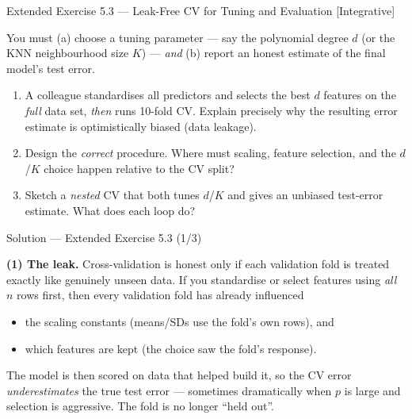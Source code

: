 \documentclass[aspectratio=169,11pt]{beamer}
\begin{document}
\begin{frame}{Extended Exercise 5.3 --- Leak-Free CV for Tuning and Evaluation [Integrative]}
  \begin{longexercise}
    You must (a) choose a tuning parameter --- say the polynomial degree
    $d$ (or the KNN neighbourhood size $K$) --- \emph{and} (b) report an
    honest estimate of the final model's test error.
    \begin{enumerate}
      \item A colleague standardises all predictors and selects the best
            $d$ features on the \emph{full} data set, \emph{then} runs
            10-fold CV. Explain precisely why the resulting error
            estimate is optimistically biased (data leakage).
      \item Design the \emph{correct} procedure. Where must scaling,
            feature selection, and the $d$/$K$ choice happen relative to
            the CV split?
      \item Sketch a \emph{nested} CV that both tunes $d$/$K$ and gives an
            unbiased test-error estimate. What does each loop do?
    \end{enumerate}
  \end{longexercise}
\end{frame}

\begin{frame}{Solution --- Extended Exercise 5.3 (1/3)}
  \begin{solutionbox}
    \textbf{(1) The leak.} Cross-validation is honest only if each
    validation fold is treated exactly like genuinely unseen data. If you
    standardise or select features using \emph{all} $n$ rows first, then
    every validation fold has already influenced
    \begin{itemize}
      \item the scaling constants (means/SDs use the fold's own rows), and
      \item which features are kept (the choice saw the fold's response).
    \end{itemize}
    The model is then scored on data that helped build it, so the CV
    error \emph{underestimates} the true test error --- sometimes
    dramatically when $p$ is large and selection is aggressive. The fold
    is no longer ``held out''.
  \end{solutionbox}
\end{frame}
\end{document}
